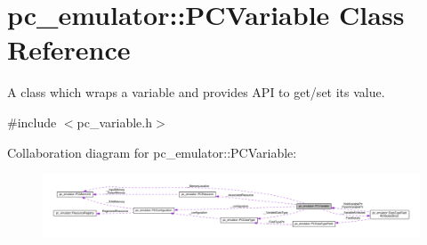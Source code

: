 \hypertarget{classpc__emulator_1_1PCVariable}{}\section{pc\+\_\+emulator\+:\+:P\+C\+Variable Class Reference}
\label{classpc__emulator_1_1PCVariable}


A class which wraps a variable and provides A\+PI to get/set its value.  




{\ttfamily \#include $<$pc\+\_\+variable.\+h$>$}



Collaboration diagram for pc\+\_\+emulator\+:\+:P\+C\+Variable\+:
\nopagebreak
\begin{figure}[H]
\begin{center}
\leavevmode
\includegraphics[width=350pt]{classpc__emulator_1_1PCVariable__coll__graph}
\end{center}
\end{figure}
